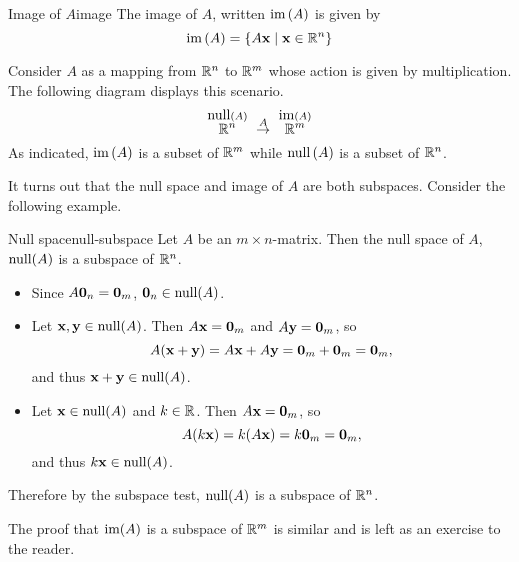 \begin{definition}{Image of $A$}{image}
  The image of $A$, written $\mbox{\rm im}\left(A\right)$ is given by
  \begin{equation*}
    \mbox{\rm im}\left(A \right) = \left\{A\mbox{\bf x} \mid \mbox{\bf x} \in \mathbb{R}^n \right\}
  \end{equation*}
\end{definition}

Consider $A$ as a mapping from $\mathbb{R}^{n}$ to $\mathbb{R}^{m}$ whose action is
given by multiplication. The following diagram displays this scenario.
\begin{equation*}
  \overset{\func{null} \tup{A} }{\R^{n}}\ \overset{A}{\rightarrow }\
  \overset{
    \func{im}\tup{A} }{\R^{m}}
\end{equation*}
As indicated, $\mbox{\rm im}\left(A\right) $ is a subset of $\mathbb{R}^{m}$ while
$\mbox{\rm null} \left(A\right) $ is a subset of $\mathbb{R}^{n}$.

It turns out that the null space and image of $A$ are both
subspaces. Consider the following example.

\begin{example}{Null space}{null-subspace}
  Let $A$ be an $m\times n$-matrix. Then the null space of $A$,
  $\mbox{\rm null}(A)$ is a subspace of $\mathbb{R}^n$.
\end{example}

\begin{solution}
  \begin{itemize}
  \item Since $A\mbox{\bf 0}_n=\mbox{\bf 0}_m$, $\mbox{\bf 0}_n\in\mbox{\rm null}(A)$.
  \item Let $\mbox{\bf x},\mbox{\bf y}\in\mbox{\rm null}(A)$.  Then
    $A\mbox{\bf x}=\mbox{\bf 0}_m$ and $A\mbox{\bf y}=\mbox{\bf 0}_m$, so
    \begin{equation*}
      A(\mbox{\bf x}+\mbox{\bf y})=A\mbox{\bf x}+A\mbox{\bf y} = \mbox{\bf 0}_m+\mbox{\bf 0}_m=\mbox{\bf 0}_m,
    \end{equation*}
    and thus $\mbox{\bf x}+\mbox{\bf y}\in\mbox{\rm null}(A)$.
  \item Let $\mbox{\bf x}\in\mbox{\rm null}(A)$ and $k\in\mathbb{R}$.  Then
    $A\mbox{\bf x}=\mbox{\bf 0}_m$, so
    \begin{equation*}
      A(k\mbox{\bf x}) = k(A\mbox{\bf x})=k\mbox{\bf 0}_m=\mbox{\bf 0}_m,
    \end{equation*}
    and thus $k\mbox{\bf x}\in\mbox{\rm null}(A)$.
  \end{itemize}
  Therefore by the subspace test, $\mbox{\rm null}(A)$ is a subspace of $\mathbb{R}^n$.
\end{solution}

The proof that $\mbox{\rm im}(A)$ is a subspace of $\mathbb{R}^m$ is similar and
is left as an exercise to the reader.

